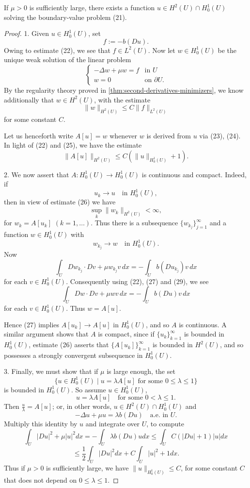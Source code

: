 \begin{theorem}
\label{thm:schaefer-quasilinear-existence}
If $\mu > 0$ is sufficiently large, there exists a function $u \in H^2(U) \cap H^1_0(U)$ solving the boundary-value problem (21).
\end{theorem}
\begin{proof}
1. Given $u \in H^1_0(U)$, set
\[
f := -b(Du).
\tag{23}
\]
Owing to estimate (22), we see that $f \in L^2(U)$. Now let $w \in H^1_0(U)$ be the unique weak solution of the linear problem
\[
\begin{cases}
-\Delta w + \mu w = f & \text{in } U \\
w = 0 & \text{on } \partial U.
\end{cases}
\tag{24}
\]
By the regularity theory proved in \cref{thm:second-derivatives-minimizers}, we know additionally that $w \in H^2(U)$, with the estimate
\[
\|w\|_{H^2(U)} \le C\|f\|_{L^2(U)}
\tag{25}
\]
for some constant $C$.

Let us henceforth write $A[u] = w$ whenever $w$ is derived from $u$ via (23), (24). In light of (22) and (25), we have the estimate
\[
\|A[u]\|_{H^2(U)} \leq C(\|u\|_{H_0^1(U)} + 1).
\tag{26}
\]

2. We now assert that $A : H_0^1(U) \to H_0^1(U)$ is continuous and compact. Indeed, if
\[
u_k \to u \quad \text{in } H_0^1(U),
\tag{27}
\]
then in view of estimate (26) we have
\[
\sup_k \|w_k\|_{H^2(U)} < \infty,
\tag{28}
\]
for $w_k = A[u_k]$ $(k = 1, \ldots)$. Thus there is a subsequence $\{w_{k_j}\}_{j=1}^\infty$ and a function $w \in H_0^1(U)$ with
\[
w_{k_j} \to w \quad \text{in } H_0^1(U).
\tag{29}
\]
Now
\[
\int_U Dw_{k_j} \cdot Dv + \mu w_{k_j} v \, dx = -\int_U b(Du_{k_j}) v \, dx
\]
for each $v \in H_0^1(U)$. Consequently using (22), (27) and (29), we see
\[
\int_U Dw \cdot Dv + \mu w v \, dx = -\int_U b(Du) v \, dx
\]
for each $v \in H_0^1(U)$. Thus $w = A[u]$.

Hence (27) implies $A[u_k] \to A[u]$ in $H_0^1(U)$, and so $A$ is continuous. A similar argument shows that $A$ is compact, since if $\{u_k\}_{k=1}^\infty$ is bounded in $H_0^1(U)$, estimate (26) asserts that $\{A[u_k]\}_{k=1}^\infty$ is bounded in $H^2(U)$, and so possesses a strongly convergent subsequence in $H_0^1(U)$.

3. Finally, we must show that if $\mu$ is large enough, the set
\[
\{u \in H_0^1(U) \mid u = \lambda A[u] \text{ for some } 0 \leq \lambda \leq 1\}
\]
is bounded in $H_0^1(U)$. So assume $u \in H_0^1(U)$,
\[
u = \lambda A[u] \quad \text{for some } 0 < \lambda \leq 1.
\]
Then $\frac{u}{\lambda} = A[u]$; or, in other words, $u \in H^2(U) \cap H_0^1(U)$ and
\[
-\Delta u + \mu u = \lambda b(Du) \quad \text{a.e. in } U.
\]
Multiply this identity by $u$ and integrate over $U$, to compute
\[
\int_U |Du|^2 + \mu|u|^2 dx = -\int_U \lambda b(Du)u dx \leq \int_U C(|Du| + 1)|u| dx
\]
\[
\leq \frac{1}{2}\int_U |Du|^2 dx + C\int_U |u|^2 + 1 dx.
\]
Thus if $\mu > 0$ is sufficiently large, we have $\|u\|_{H_0^1(U)} \leq C$, for some constant $C$ that does not depend on $0 \leq \lambda \leq 1$.


\end{proof}
